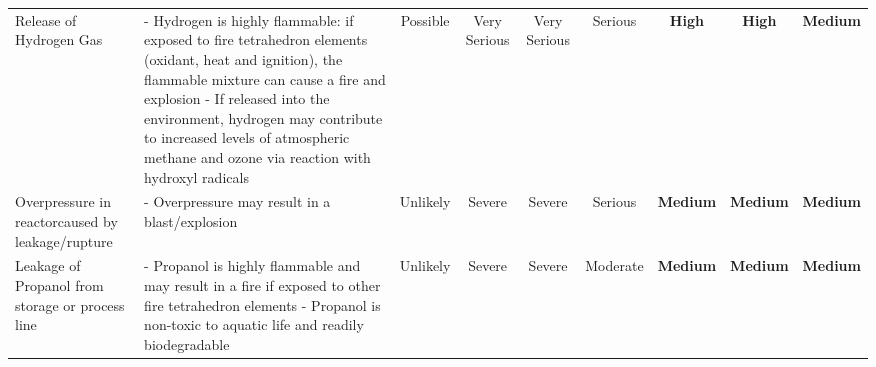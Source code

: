 \begin{table}
\begin{adjustbox}{max width=\linewidth}
\begin{tabularx}{\linewidth}{|p{3cm}|p{8cm}|c|c|c|c|c|c|c|}
Release of  Hydrogen Gas                                                       & - Hydrogen is highly flammable: if exposed     to fire tetrahedron elements (oxidant, heat    and ignition), the flammable mixture can      cause a fire and explosion  - If released into the environment, hydrogen     may contribute to increased levels of     atmospheric methane and ozone via reaction     with hydroxyl radicals & Possible                              & Very  Serious       & Very Serious          & Serious                                                               & \cellcolor[HTML]{FD6864}\textbf{High}                         & \cellcolor[HTML]{FD6864}\textbf{High}                           & \cellcolor[HTML]{FCFF2F}\textbf{Medium}                                 \\
Overpressure in  reactorcaused by  leakage/rupture                           & - Overpressure may result in a blast/explosion                                                                                                                                                                                                                                                                                                                                                 & Unlikely                              & Severe                                                        & Severe                                                          & Serious                                                               & \cellcolor[HTML]{FCFF2F}\textbf{Medium}                       & \cellcolor[HTML]{FCFF2F}\textbf{Medium}                         & \cellcolor[HTML]{FCFF2F}\textbf{Medium}                                 \\
Leakage of Propanol  from storage or  process line                           & - Propanol is highly flammable and may result in    a fire if exposed to other fire tetrahedron elements - Propanol is non-toxic to aquatic life and readily     biodegradable                                                                                                                                                                   & Unlikely                              & Severe                                                        & Severe                                                          & Moderate                                                              & \cellcolor[HTML]{FCFF2F}\textbf{Medium}                       & \cellcolor[HTML]{FCFF2F}\textbf{Medium}                         & \cellcolor[HTML]{FCFF2F}\textbf{Medium}                                 \\

\end{tabularx}
\end{adjustbox}
\end{table}
